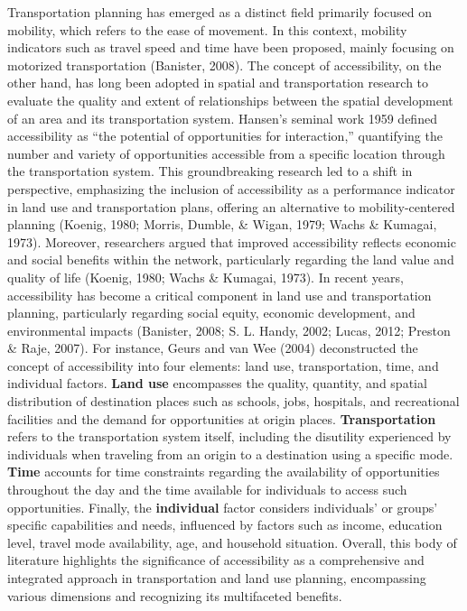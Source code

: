 \documentclass[12pt,twoside]{reedthesis}
\begin{document}
Transportation planning has emerged as a distinct field primarily focused on mobility, which refers to the ease of movement. In this context, mobility indicators such as travel speed and time have been proposed, mainly focusing on motorized transportation (Banister, 2008). The concept of accessibility, on the other hand, has long been adopted in spatial and transportation research to evaluate the quality and extent of relationships between the spatial development of an area and its transportation system. Hansen's seminal work 1959 defined accessibility as ``the potential of opportunities for interaction,'' quantifying the number and variety of opportunities accessible from a specific location through the transportation system. This groundbreaking research led to a shift in perspective, emphasizing the inclusion of accessibility as a performance indicator in land use and transportation plans, offering an alternative to mobility-centered planning (Koenig, 1980; Morris, Dumble, \& Wigan, 1979; Wachs \& Kumagai, 1973). Moreover, researchers argued that improved accessibility reflects economic and social benefits within the network, particularly regarding the land value and quality of life (Koenig, 1980; Wachs \& Kumagai, 1973). In recent years, accessibility has become a critical component in land use and transportation planning, particularly regarding social equity, economic development, and environmental impacts (Banister, 2008; S. L. Handy, 2002; Lucas, 2012; Preston \& Raje, 2007). For instance, Geurs and van Wee (2004) deconstructed the concept of accessibility into four elements: land use, transportation, time, and individual factors. \textbf{Land use} encompasses the quality, quantity, and spatial distribution of destination places such as schools, jobs, hospitals, and recreational facilities and the demand for opportunities at origin places. \textbf{Transportation} refers to the transportation system itself, including the disutility experienced by individuals when traveling from an origin to a destination using a specific mode. \textbf{Time} accounts for time constraints regarding the availability of opportunities throughout the day and the time available for individuals to access such opportunities. Finally, the \textbf{individual} factor considers individuals' or groups' specific capabilities and needs, influenced by factors such as income, education level, travel mode availability, age, and household situation. Overall, this body of literature highlights the significance of accessibility as a comprehensive and integrated approach in transportation and land use planning, encompassing various dimensions and recognizing its multifaceted benefits.
\end{document}
